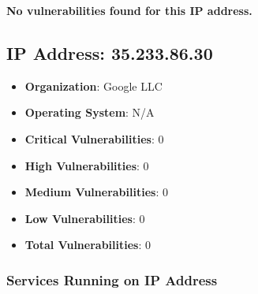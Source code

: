 \documentclass{article}
\begin{document}
\textbf{No vulnerabilities found for this IP address.}


\clearpage



\subsection*{IP Address: 35.233.86.30}

\begin{itemize}
    \item \textbf{Organization}: Google LLC
    \item \textbf{Operating System}:  N/A 
    \item \textbf{Critical Vulnerabilities}: 0
    \item \textbf{High Vulnerabilities}: 0
    \item \textbf{Medium Vulnerabilities}: 0
    \item \textbf{Low Vulnerabilities}: 0
    \item \textbf{Total Vulnerabilities}: 0
\end{itemize}

\subsubsection*{Services Running on IP Address}
\end{document}
